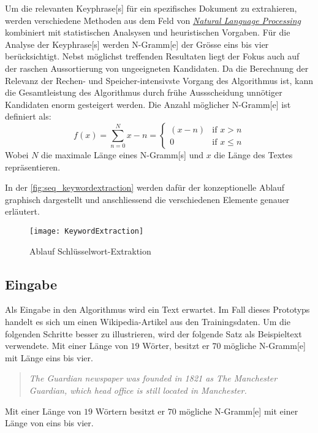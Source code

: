 Um die relevanten \gls{Keyphrase}[s] für ein spezifisches Dokument zu extrahieren, werden verschiedene Methoden aus dem Feld von \hyperref[natural-language-processing]{\textit{Natural Language Processing}} kombiniert mit statistischen Analsysen und heuristischen Vorgaben. Für die Analyse der \gls{Keyphrase}[s] werden \gls{N-Gramm}[e] der Grösse eins bis vier berücksichtigt. Nebst möglichst treffenden Resultaten liegt der Fokus auch auf der raschen Aussortierung von ungeeigneten Kandidaten. Da die Berechnung der Relevanz der Rechen- und Speicher-intensivste Vorgang des Algorithmus ist, kann die Gesamtleistung des Algorithmus durch frühe Aussscheidung unnötiger Kandidaten enorm gesteigert werden. Die Anzahl möglicher \gls{N-Gramm}[e] ist definiert als: 
\[f(x)=\sum_{n=0}^N x - n  =
\begin{cases} 
   (x - n)  & \text{if } x > n \\
   0      & \text{if } x \leq n
  \end{cases}\]
Wobei $N$ die maximale Länge eines \gls{N-Gramm}[s] und $x$ die Länge des Textes repräsentieren.

In der \autoref{fig:seq_keywordextraction} werden dafür der konzeptionelle Ablauf graphisch dargestellt und anschliessend die verschiedenen Elemente genauer erläutert.

    \begin{figure}[H]
    \centering
    \texttt{[image: KeywordExtraction]}
    \caption{Ablauf Schlüsselwort-Extraktion}
    \label{fig:seq_keywordextraction}
    \end{figure}
 
 
 

\subsection{Eingabe}


Als Eingabe in den Algorithmus wird ein Text erwartet. Im Fall dieses Prototyps handelt es sich um einen Wikipedia-Artikel aus den Trainingsdaten. Um die folgenden Schritte besser zu illustrieren, wird der folgende Satz als Beispieltext verwendete. Mit einer Länge von $19$ Wörter, besitzt er $70$ mögliche \gls{N-Gramm}[e] mit Länge eins bis vier.

\begin{quote}
\textit{The Guardian newspaper was founded in 1821 as \glqq The Manchester Guardian\grqq, which head office is still located in Manchester.}
\end{quote}
Mit einer Länge von $19$ Wörtern besitzt er $70$ mögliche \gls{N-Gramm}[e] mit einer Länge von eins bis vier.

